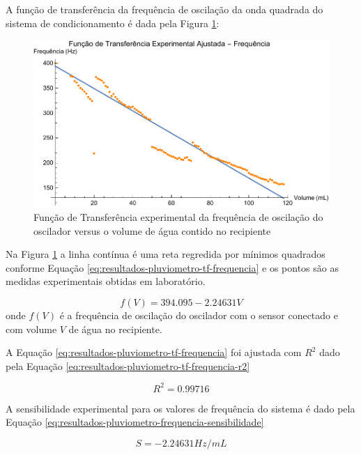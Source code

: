 \documentclass[a4paper]{instrumentacao}
\begin{document}
A função de transferência da frequência de oscilação da onda quadrada do sistema de condicionamento é dada pela Figura \ref{fig:resultados-pluviometro-tf-frequencia}:

\begin{figure}[H]
	\centering \includegraphics[width=\textwidth]{Nivel/Experimental/Frequencia-Ajuste.pdf}
	\caption{Função de Transferência experimental da frequência de oscilação do oscilador versus o volume de água contido no recipiente}
	\label{fig:resultados-pluviometro-tf-frequencia}
\end{figure}


Na Figura \ref{fig:resultados-pluviometro-tf-frequencia} a linha contínua é uma reta regredida por mínimos quadrados conforme Equação \ref{eq:resultados-pluviometro-tf-frequencia} e os pontos são as medidas experimentais obtidas em laboratório.

\begin{equation}
	f(V) = 394.095 - 2.24631 V
	\label{eq:resultados-pluviometro-tf-frequencia}
\end{equation}
\noindent onde $f(V)$ é a frequência de oscilação do oscilador com o sensor conectado e com volume $V$ de água no recipiente.

A Equação \ref{eq:resultados-pluviometro-tf-frequencia} foi ajustada com $R^2$ dado pela Equação \ref{eq:resultados-pluviometro-tf-frequencia-r2} 

\begin{equation}
	R^2 = 0.99716
	\label{eq:resultados-pluviometro-tf-frequencia-r2}
\end{equation}

A sensibilidade experimental para os valores de frequência do sistema é dado pela Equação \ref{eq:resultados-pluviometro-frequencia-sensibilidade}

\begin{equation}
	S = -2.24631 Hz/mL
	\label{eq:resultados-pluviometro-frequencia-sensibilidade}
\end{equation}
\end{document}
